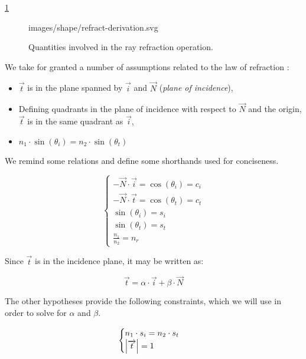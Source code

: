 \cref{fig:refract-derivation}
\begin{figure} \caption{\label{fig:refract-derivation} Quantities involved
in the ray refraction operation.}

           {images/shape/refract-derivation.svg}
\end{figure}

We take for granted a number of assumptions related to the law of refraction
\cite{wiki:snell-refraction}:

\begin{itemize}
\item $\overrightarrow{t}$ is in the plane spanned by $\overrightarrow{i}$
and $\overrightarrow{N}$ (\emph{plane of incidence}),
\item Defining quadrants in the plane of incidence with respect to
$\overrightarrow{N}$ and the origin, $\overrightarrow{t}$ is in
the same quadrant as $\overrightarrow{i}$,
\item $n_1 \cdot \sin(\theta_i) = n_2 \cdot \sin(\theta_t)$
\end{itemize}

We remind some relations and define some shorthands used for conciseness.

\begin{equation} \begin{cases}
- \overrightarrow{N} \cdot \overrightarrow{i} = \cos(\theta_i) = c_i \\
- \overrightarrow{N} \cdot \overrightarrow{t} = \cos(\theta_t) = c_t \\
\sin(\theta_i) = s_i \\
\sin(\theta_t) = s_t \\
\frac{n_1}{n_2} = n_r
\end{cases} \end{equation}

Since $\overrightarrow{t}$ is in the incidence plane, it may be written as:

\begin{equation}
\overrightarrow{t} = \alpha \cdot \overrightarrow{i}
                     + \beta \cdot \overrightarrow{N}
\end{equation}

The other hypotheses provide the following constraints, which we will use
in order to solve for $\alpha$ and $\beta$.

\begin{equation} \begin{cases}
n_1 \cdot s_i = n_2 \cdot s_t \\
\abs{\overrightarrow{t}} = 1
\end{cases} \end{equation}

